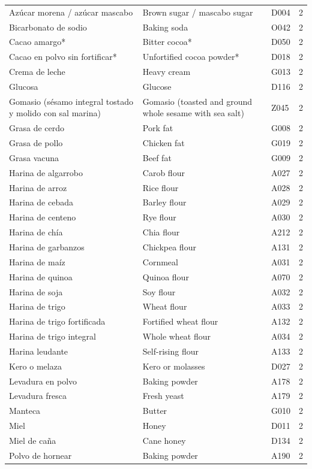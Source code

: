 {\begin{longtable}{p{4.3cm}p{5.5cm}p{1.5cm}p{0.7cm}}
Azúcar morena / azúcar mascabo & Brown sugar / mascabo sugar & D004 & 2\\
Bicarbonato de sodio & Baking soda & O042 & 2\\
Cacao amargo* & Bitter cocoa* & D050 & 2\\
Cacao en polvo sin fortificar* & Unfortified cocoa powder* & D018 & 2\\
Crema de leche & Heavy cream & G013 & 2\\
Glucosa & Glucose & D116 & 2\\
Gomasio (sésamo integral tostado y molido con sal marina) & Gomasio (toasted and ground whole sesame with sea salt) & Z045 & 2\\
Grasa de cerdo & Pork fat & G008 & 2\\
Grasa de pollo & Chicken fat & G019 & 2\\
Grasa vacuna & Beef fat & G009 & 2\\
Harina de algarrobo & Carob flour & A027 & 2\\
Harina de arroz & Rice flour & A028 & 2\\
Harina de cebada & Barley flour & A029 & 2\\
Harina de centeno & Rye flour & A030 & 2\\
Harina de chía & Chia flour & A212 & 2\\
Harina de garbanzos & Chickpea flour & A131 & 2\\
Harina de maíz & Cornmeal & A031 & 2\\
Harina de quinoa & Quinoa flour & A070 & 2\\
Harina de soja & Soy flour & A032 & 2\\
Harina de trigo & Wheat flour & A033 & 2\\
Harina de trigo fortificada & Fortified wheat flour & A132 & 2\\
Harina de trigo integral & Whole wheat flour & A034 & 2\\
Harina leudante & Self-rising flour & A133 & 2\\
Kero o melaza & Kero or molasses & D027 & 2\\
Levadura en polvo & Baking powder & A178 & 2\\
Levadura fresca & Fresh yeast & A179 & 2\\
Manteca & Butter & G010 & 2\\
Miel & Honey & D011 & 2\\
Miel de caña & Cane honey & D134 & 2\\
Polvo de hornear & Baking powder & A190 & 2\\

\end{longtable}}
